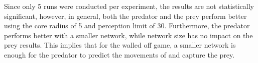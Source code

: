 Since only 5 runs were conducted per experiment, the results are not statistically significant, however, in general, both the predator and the prey perform better using the core radius of 5 and perception limit of 30. Furthermore, the predator performs better with a smaller network, while network size has no impact on the prey results. This implies that for the walled off game, a smaller network is enough for the predator to predict the movements of and capture the prey.

